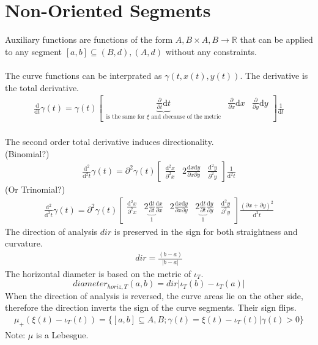 \documentclass{report}
\begin{document}
\section{Non-Oriented Segments}
Auxiliary functions are functions of the form $A,B \times A,B \rightarrow \mathbb{R}$ that can be applied to any segment $[a,b] \subseteq (B,d),(A,d)$ without any constraints.\\\\
The curve functions can be interprated as $\gamma(t,x(t),y(t))$. The derivative is the total derivative.
\begin{align}
\frac{\mathrm{d}}{\mathrm{d} t} \gamma (t) = \gamma(t) \begin{bmatrix} \underbrace{\frac{\partial}{\partial t} \mathrm{d} t}_{\text{is the same for } \xi \text{ and } \iota \text{because of the metric}} & \frac{\partial}{\partial x}  \mathrm{d} x & \frac{\partial}{\partial y} \mathrm{d} y \end{bmatrix} \frac{1}{\mathrm{d}t}
\end{align}\\
The second order total derivative induces directionality.\\
(Binomial?)
\begin{align}
\frac{\mathrm{d}^2}{\mathrm{d}^2t}\gamma(t)=\partial^2 \gamma(t) \begin{bmatrix} \frac{\mathrm{d}^2x}{\partial^2 x} & 2 \frac{\mathrm{d}x\mathrm{d}y}{\partial x \partial y} & \frac{\mathrm{d}^2y}{\partial^2 y}\end{bmatrix}\frac{1}{\mathrm{d}^2t}
\end{align}
(Or Trinomial?)
\begin{align}
\frac{\mathrm{d}^2}{\mathrm{d}^2t}\gamma(t)=\partial^2 \gamma (t) \begin{bmatrix}\frac{\mathrm{d}^2 x}{\partial^2 x} & 2 \underbrace{\frac{\mathrm{d}t}{\partial t}}_{1} \frac{\mathrm{d}x}{\partial x} & 2 \frac{\mathrm{d}x\mathrm{d}y}{\partial x \partial y} & 2 \underbrace{\frac{\mathrm{d}t}{\partial t}}_{1} \frac{\mathrm{d}y}{\partial y} & \frac{\mathrm{d}^2 y}{\partial^2 y}\end{bmatrix}\frac{(\partial x + \partial y)^2}{\mathrm{d}^2 t}
\end{align}
The direction of analysis $dir$ is preserved in the sign for both straightness and curvature.
\begin{align}
dir = \frac{(b-a)}{\lvert b-a \rvert}
\end{align}
The horizontal diameter is based on the metric of $\iota_{T}$.
\begin{equation}
diameter_{horiz,T}(a,b)= dir \lvert \iota_{T}(b) - \iota_{T}(a) \rvert
\end{equation}
When the direction of analysis is reversed, the curve areas lie on the other side, therefore the direction inverts the sign of the curve segments. Their sign flips.
\begin{align}
\mu_{+}(\xi(t) -\iota_{T}(t))=\{[a,b] \subseteq A,B; \gamma(t)=\xi(t) -\iota_{T}(t) \vert \gamma(t)>0\}
\end{align}
Note: $\mu$ is a Lebesgue.
\end{document}
